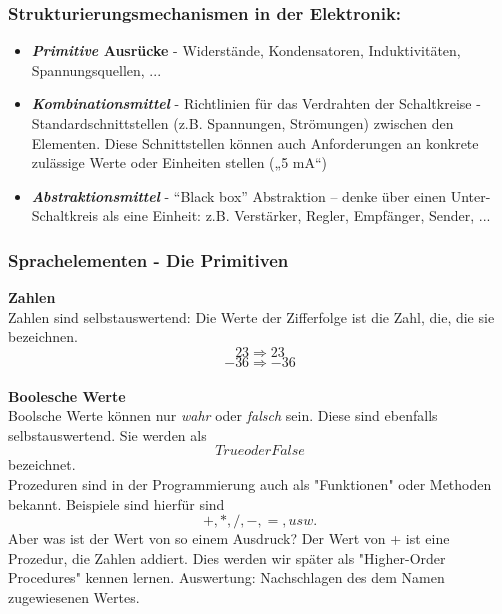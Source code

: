 \subsubsection{Strukturierungsmechanismen in der Elektronik:}
\begin{itemize}
	\item \textbf{\textit{Primitive} Ausrücke}
		\subitem - Widerstände, Kondensatoren, Induktivitäten, Spannungsquellen, ...

	\item \textbf{\textit{Kombinationsmittel}}
		\subitem - Richtlinien für das Verdrahten der Schaltkreise
		\subitem - Standardschnittstellen (z.B. Spannungen, Strömungen) zwischen den
		Elementen. Diese Schnittstellen können auch Anforderungen an
		konkrete zulässige Werte oder Einheiten stellen („5 mA“)

	\item \textbf{\textit{Abstraktionsmittel}}
		\subitem - 	“Black box” Abstraktion – denke über einen Unter-Schaltkreis als eine
		Einheit: z.B. Verstärker, Regler, Empfänger, Sender, ...
\end{itemize}

\subsubsection{Sprachelementen - Die Primitiven}
\textbf{Zahlen} \\
Zahlen sind selbstauswertend: Die Werte der Zifferfolge ist die Zahl,
die, die sie bezeichnen.
$$ 23 \Rightarrow 23 $$
$$ -36 \Rightarrow -36 $$
\\

\textbf{Boolesche Werte} \\
Boolsche Werte können nur \textit{wahr} oder \textit{falsch} sein. Diese sind ebenfalls
selbstauswertend. Sie werden als $$True oder False$$ bezeichnet.\\


Prozeduren sind in der Programmierung auch als "Funktionen" oder Methoden bekannt. Beispiele sind hierfür sind
$$ +, *, /, -, =, usw.$$
Aber was ist der Wert von so einem Ausdruck? Der Wert von + ist eine Prozedur, die Zahlen addiert.
Dies werden wir später als "Higher-Order Procedures" kennen lernen.
Auswertung: Nachschlagen des dem Namen zugewiesenen Wertes.

